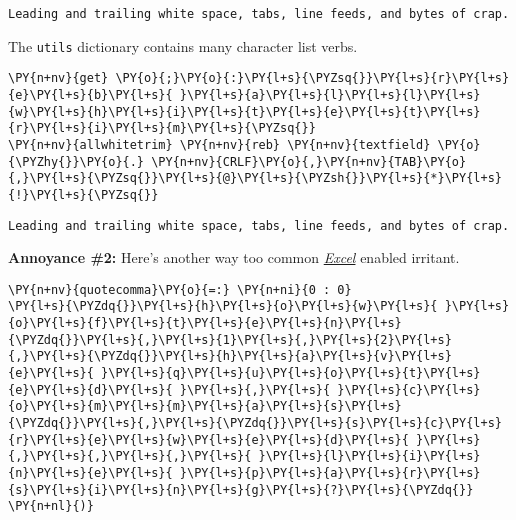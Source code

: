     \begin{Verbatim}[commandchars=\\\{\}]
 Leading and trailing white space, tabs, line feeds, and bytes of crap.
    \end{Verbatim}

    The \texttt{utils} dictionary contains many character list verbs.

    \begin{tcolorbox}[breakable, size=fbox, boxrule=1pt, pad at break*=1mm,colback=cellbackground, colframe=cellborder]
\begin{Verbatim}[commandchars=\\\{\}]
\PY{n+nv}{get} \PY{o}{;}\PY{o}{:}\PY{l+s}{\PYZsq{}}\PY{l+s}{r}\PY{l+s}{e}\PY{l+s}{b}\PY{l+s}{ }\PY{l+s}{a}\PY{l+s}{l}\PY{l+s}{l}\PY{l+s}{w}\PY{l+s}{h}\PY{l+s}{i}\PY{l+s}{t}\PY{l+s}{e}\PY{l+s}{t}\PY{l+s}{r}\PY{l+s}{i}\PY{l+s}{m}\PY{l+s}{\PYZsq{}}
\PY{n+nv}{allwhitetrim} \PY{n+nv}{reb} \PY{n+nv}{textfield} \PY{o}{\PYZhy{}}\PY{o}{.} \PY{n+nv}{CRLF}\PY{o}{,}\PY{n+nv}{TAB}\PY{o}{,}\PY{l+s}{\PYZsq{}}\PY{l+s}{@}\PY{l+s}{\PYZsh{}}\PY{l+s}{*}\PY{l+s}{!}\PY{l+s}{\PYZsq{}}
\end{Verbatim}
\end{tcolorbox}

    \begin{Verbatim}[commandchars=\\\{\}]
Leading and trailing white space, tabs, line feeds, and bytes of crap.
    \end{Verbatim}

    \textbf{Annoyance \#2:} Here's another way too common
\href{https://www.spreadsheetsmadeeasy.com/understanding-csv-files-in-excel/}{\emph{Excel}}
enabled irritant.

    \begin{tcolorbox}[breakable, size=fbox, boxrule=1pt, pad at break*=1mm,colback=cellbackground, colframe=cellborder]
\begin{Verbatim}[commandchars=\\\{\}]
\PY{n+nv}{quotecomma}\PY{o}{=:} \PY{n+ni}{0 : 0}
\PY{l+s}{\PYZdq{}}\PY{l+s}{h}\PY{l+s}{o}\PY{l+s}{w}\PY{l+s}{ }\PY{l+s}{o}\PY{l+s}{f}\PY{l+s}{t}\PY{l+s}{e}\PY{l+s}{n}\PY{l+s}{\PYZdq{}}\PY{l+s}{,}\PY{l+s}{1}\PY{l+s}{,}\PY{l+s}{2}\PY{l+s}{,}\PY{l+s}{\PYZdq{}}\PY{l+s}{h}\PY{l+s}{a}\PY{l+s}{v}\PY{l+s}{e}\PY{l+s}{ }\PY{l+s}{q}\PY{l+s}{u}\PY{l+s}{o}\PY{l+s}{t}\PY{l+s}{e}\PY{l+s}{d}\PY{l+s}{ }\PY{l+s}{,}\PY{l+s}{ }\PY{l+s}{c}\PY{l+s}{o}\PY{l+s}{m}\PY{l+s}{m}\PY{l+s}{a}\PY{l+s}{s}\PY{l+s}{\PYZdq{}}\PY{l+s}{,}\PY{l+s}{\PYZdq{}}\PY{l+s}{s}\PY{l+s}{c}\PY{l+s}{r}\PY{l+s}{e}\PY{l+s}{w}\PY{l+s}{e}\PY{l+s}{d}\PY{l+s}{ }\PY{l+s}{,}\PY{l+s}{,}\PY{l+s}{,}\PY{l+s}{ }\PY{l+s}{l}\PY{l+s}{i}\PY{l+s}{n}\PY{l+s}{e}\PY{l+s}{ }\PY{l+s}{p}\PY{l+s}{a}\PY{l+s}{r}\PY{l+s}{s}\PY{l+s}{i}\PY{l+s}{n}\PY{l+s}{g}\PY{l+s}{?}\PY{l+s}{\PYZdq{}}
\PY{n+nl}{)}
\end{Verbatim}
\end{tcolorbox}

